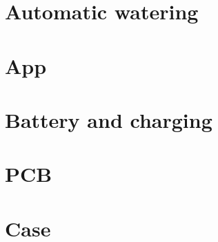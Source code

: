 \section{Automatic watering}

\section{App}

\section{Battery and charging}

\section{PCB}

\section{Case}